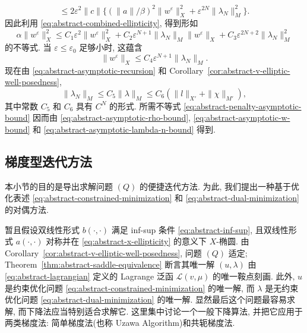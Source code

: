 \begin{Proof}
\[\le2\varepsilon^2\|c\|
\{(\|a\|/\beta)^2\|w^\varepsilon\|_X^2
+\varepsilon^{2N}\|\lambda_N\|_M^2\}.
\]
因此利用 
\eqref{eq:abstract-combined-ellipticity}, 得到形如
\[
\alpha\|w^\varepsilon\|_X^2
\le C_1\varepsilon^2\|w^\varepsilon\|_X^2
+C_2\varepsilon^{N+1}\|\lambda_N\|_M\|w^\varepsilon\|_X
+C_3\varepsilon^{2N+2}\|\lambda_N\|_M^2
\]
的不等式. 当 $\varepsilon\le\varepsilon_0$ 足够小时, 这蕴含
\begin{equation}\label{eq:abstract-asymptotic-w-bound}
\|w^\varepsilon\|_X
\le C_4\varepsilon^{N+1}\|\lambda_N\|_M.
\end{equation}
现在由 
\eqref{eq:abstract-asymptotic-recursion} 和
Corollary~\ref{cor:abstract-v-elliptic-well-posedness},
\begin{equation}\label{eq:abstract-asymptotic-lambda-n-bound}
\|\lambda_N\|_M\le C_5\|\lambda\|_M
\le C_6(\|l\|_{X'}+\|\chi\|_{M'}),
\end{equation}
其中常数 $C_5$ 和 $C_6$ 具有 $C^N$ 的形式.
所需不等式 
\eqref{eq:abstract-penalty-asymptotic-bound} 因而由
\eqref{eq:abstract-asymptotic-rho-bound},
\eqref{eq:abstract-asymptotic-w-bound} 和
\eqref{eq:abstract-asymptotic-lambda-n-bound} 得到.
\end{Proof}

\setcounter{subsection}{3}
\subsection{梯度型迭代方法}\label{subsec:abstract-gradient-iterations}

本小节的目的是导出求解问题 $(Q)$ 的便捷迭代方法.
为此, 我们提出一种基于优化表述
\eqref{eq:abstract-constrained-minimization} 和
\eqref{eq:abstract-dual-minimization} 的对偶方法.

暂且假设双线性形式 $b(\cdot,\cdot)$ 满足 inf-sup 条件
\eqref{eq:abstract-inf-sup}, 且双线性形式 $a(\cdot,\cdot)$ 对称并在
\eqref{eq:abstract-x-ellipticity} 的意义下 $X$-椭圆.
由 Corollary~\ref{cor:abstract-v-elliptic-well-posedness}, 问题 $(Q)$ 适定;
Theorem~\ref{thm:abstract-saddle-equivalence} 断言其唯一解 $(u,\lambda)$
由 
\eqref{eq:abstract-lagrangian} 定义的 Lagrange 泛函
$\mathcal L(v,\mu)$ 的唯一鞍点刻画. 此外, $u$ 是约束优化问题
\eqref{eq:abstract-constrained-minimization} 的唯一解, 而 $\lambda$ 是无约束优化问题
\eqref{eq:abstract-dual-minimization} 的唯一解. 显然最后这个问题最容易求解,
而下降法应当特别适合求解它. 这里集中讨论一个一般下降算法,
并把它应用于两类梯度法: 简单梯度法(也称 Uzawa Algorithm)和共轭梯度法.


